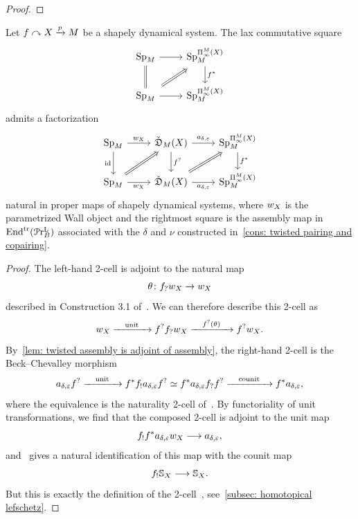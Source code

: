 \begin{proof}
\end{proof}

\begin{thm}\label{thm: cosheaves factorization}
  Let $f\curvearrowright X\xrightarrow pM$ be a shapely dynamical system. The lax commutative square
  \[
    \begin{tikzcd}
      \Sp_\base\arrow[d,equal] \arrow[r] & \Sp_\base^{\ani{\tset}[\base]}\arrow[d,"f^*"]\\
      \Sp_\base\arrow[r]\arrow[ru,Rightarrow, shorten <=5pt,shorten >=5pt] & \Sp_\base^{\ani{\tset}[\base]}
    \end{tikzcd}
  \]
  admits a factorization
  \begin{equation}
    \label{eq:categorical-factorization-of-param-reidemeister}
    \begin{tikzcd}
      \Sp_\base & {\coShat_\base(\tset)} & \Sp_\base^{\ani{\tset}[\base]} \\
      \Sp_\base & {\coShat_\base(\tset)} & \Sp_\base^{\ani{\tset}[\base]}
      \arrow["{w_{\tset}}", from=1-1, to=1-2]
      \arrow["\id"', from=1-1, to=2-1]
      \arrow["{a_{\delta ,\varepsilon} }", from=1-2, to=1-3]
      \arrow["{f^?}", from=1-2, to=2-2]
      \arrow["f^{\ast}", from=1-3, to=2-3]
      \arrow[Rightarrow, from=2-2, to=1-3]
      \arrow["{w_{\tset}}"', from=2-1, to=2-2]
      \arrow[Rightarrow, from=2-1, to=1-2]
      \arrow["{a_{\delta ,\varepsilon} }"', from=2-2, to=2-3]
    \end{tikzcd}
  \end{equation}
  natural in proper maps of shapely dynamical systems,
  where $w_X$ is the parametrized Wall object and the rightmost square is the assembly map in $\mathrm{End}^{\mathrm{tr}} (\mathcal{P}\mathrm{r}^{\mathrm{L}}_{B})$ associated with the $\delta$ and $\nu$ constructed in~\cref{cons: twisted pairing and copairing}. 
\end{thm}
\begin{proof}
  The left-hand 2-cell is adjoint to the natural map \[\theta\colon f_?w_X\to w_X\]  described in Construction 3.1 of~\cite{Harr2026b}. We can therefore describe this 2-cell as
  \[
    w_X\xrightarrow{\quad \text{unit}\quad} f^?f_?w_X\xrightarrow{\quad f^?(\theta )\quad} f^?w_X.
  \]
  By~\cref{lem: twisted assembly is adjoint of assembly}, the right-hand 2-cell is the Beck--Chevalley morphism
  \[
    a_{\delta ,\varepsilon }f^?\xrightarrow{\quad \text{unit}\quad} f^*f_!a_{\delta ,\varepsilon }f^?\simeq f^*a_{\delta ,\varepsilon }f_?f^?\xrightarrow{\quad \text{counit}\quad}f^*a_{\delta ,\varepsilon },
  \]
  where the equivalence is the naturality 2-cell of~\cite[Thm~8.14]{Mukherjee_Nikolaus2026}. By functoriality of unit transformations, we find that the composed 2-cell is adjoint to the unit map \[f_!f^*a_{\delta ,\varepsilon }w_X\longrightarrow a_{\delta ,\varepsilon },\] and~\cite[Lem~3.4]{Harr2026b} gives a natural identification of this map with the counit map
  \[
    f_!\mathbb{S}_X\longrightarrow\mathbb{S}_X.
  \]
  But this is exactly the definition of the 2-cell~, see~\cref{subsec: homotopical lefschetz}. 
\end{proof}
